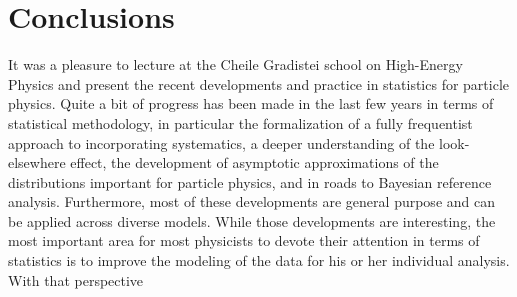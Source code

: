 \section{Conclusions}


It was a pleasure to lecture at the Cheile Gradistei school on High-Energy Physics and present the recent developments and practice in statistics for particle physics.  Quite a bit of progress has been made in the last few years in terms of statistical methodology, in particular the formalization of a fully frequentist approach to incorporating systematics, a deeper understanding of the look-elsewhere effect, the development of asymptotic approximations of the distributions important for particle physics, and in roads to Bayesian reference analysis. Furthermore, most of these developments are general purpose and can be applied across diverse models.   While those developments are interesting, the most important area for most physicists to devote their attention in terms of statistics is to improve the modeling of the data for his or her individual analysis.  With that perspective
